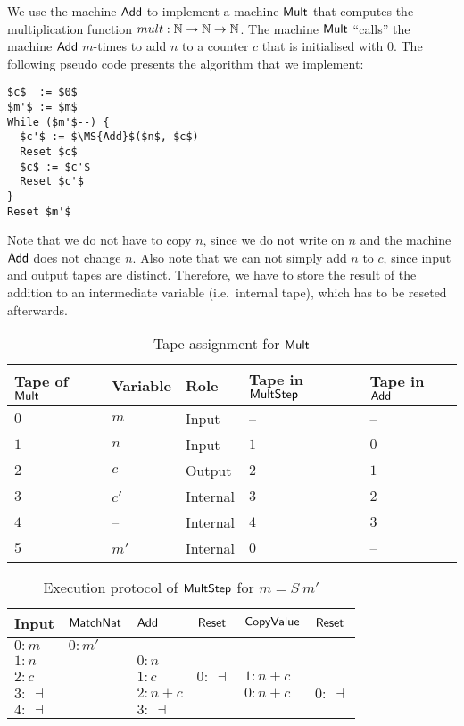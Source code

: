 We use the machine $\mathsf{Add}$ to implement a machine $\mathsf{Mult}$ that computes the multiplication function $mult : \mathbb{N}\rightarrow\mathbb{N}\rightarrow\mathbb{N}$.  The machine
$\mathsf{Mult}$ ``calls'' the machine $\mathsf{Add}$ $m$-times to add $n$ to a counter $c$ that is initialised with $0$.  The following pseudo code presents
the algorithm that we implement: { \small
\begin{lstlisting}[style=pseudocode]
$c$  := $0$
$m'$ := $m$
While ($m'$--) {
  $c'$ := $\MS{Add}$($n$, $c$)
  Reset $c$
  $c$ := $c'$
  Reset $c'$
}
Reset $m'$
\end{lstlisting}
}%
Note that we do not have to copy $n$, since we do not write on $n$ and the machine $\mathsf{Add}$ does not change
$n$.  Also note that we can not simply add $n$ to $c$, since input and output tapes are distinct.  Therefore, we have to store the result of the
addition to an intermediate variable (i.e.\ internal tape), which has to be reseted afterwards.

\begin{table}[t]
  \centering
  \begin{tabular}{l|l|l|l|l}
    Tape of $\mathsf{Mult}$ & Variable & Role & Tape in $\mathsf{MultStep}$ & Tape in $\mathsf{Add}$ \\ \hline
    $0$ & $m$  & Input    & --  & --  \\
    $1$ & $n$  & Input    & $1$ & $0$ \\
    $2$ & $c$  & Output   & $2$ & $1$ \\
    $3$ & $c'$ & Internal & $3$ & $2$ \\
    $4$ & --   & Internal & $4$ & $3$ \\
    $5$ & $m'$ & Internal & $0$ & --  \\
  \end{tabular}
  \caption{Tape assignment for $\mathsf{Mult}$}
  \label{tab:tapes-Mult}
\end{table}
\begin{table}[t]
  \centering
  \begin{tabular}{l||l|l|l|l|l}
    Input       & $\mathsf{MatchNat}$ & $\mathsf{Add}$  & $\mathsf{Reset}$ & $\mathsf{CopyValue}$ & $\mathsf{Reset}$   \\ \hline
    $0: m$      & $0 : m'$        &             &              &                  &                \\
    $1: n$      &                 & $0: n$      &              &                  &                \\
    $2: c$      &                 & $1: c$      & $0:~\dashv$  & $1: n+c$         &                \\
    $3:~\dashv$ &                 & $2: n+c$    &              & $0: n+c$         & $0:~\dashv$    \\
    $4:~\dashv$ &                 & $3:~\dashv$ &              &                  &                \\
  \end{tabular}
  \caption{Execution protocol of $\mathsf{MultStep}$ for $m=S~m'$}
  \label{tab:exec-MultStep}
\end{table}

